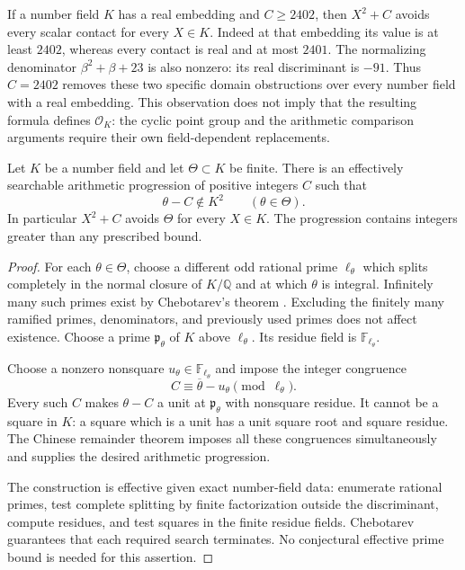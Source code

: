 If a number field $K$ has a real embedding and $C\ge2402$, then
$X^2+C$ avoids every scalar contact for every $X\in K$. Indeed at
that embedding its value is at least $2402$, whereas every contact
is real and at most $2401$. The normalizing denominator
$\beta^2+\beta+23$ is also nonzero: its real discriminant is
$-91$. Thus $C=2402$ removes these two specific domain obstructions
over every number field with a real embedding. This observation
does not imply that the resulting formula defines $\mathcal O_K$:
the cyclic point group and the arithmetic comparison arguments
require their own field-dependent replacements.

\begin{lemma}
\label{p3:finite-square-avoidance}
Let $K$ be a number field and let $\Theta\subset K$ be finite.
There is an effectively searchable arithmetic progression of positive
integers $C$ such that
\[
                  \theta-C\notin K^2
                       \qquad(\theta\in\Theta).
\]
In particular $X^2+C$ avoids $\Theta$ for every $X\in K$. The
progression contains integers greater than any prescribed bound.
\end{lemma}
\begin{proof}
For each $\theta\in\Theta$, choose a different odd rational prime
$\ell_\theta$ which splits completely in the normal closure of
$K/\mathbb Q$ and at which $\theta$ is integral. Infinitely many
such primes exist by Chebotarev's theorem
\cite[Section~2.1, Theorem~1]{p2lbSerre1981}. Excluding the finitely
many ramified primes, denominators, and previously used primes
does not affect existence. Choose a prime $\mathfrak p_\theta$
of $K$ above $\ell_\theta$. Its residue field is
$\mathbb F_{\ell_\theta}$.

Choose a nonzero nonsquare
$u_\theta\in\mathbb F_{\ell_\theta}$ and impose the integer
congruence
\[
                C\equiv\overline\theta-u_\theta
                       \pmod{\ell_\theta}.
\]
Every such $C$ makes $\theta-C$ a unit at
$\mathfrak p_\theta$ with nonsquare residue. It cannot be a
square in $K$: a square which is a unit has a unit square root
and square residue. The Chinese remainder theorem imposes all
these congruences simultaneously and supplies the desired
arithmetic progression.

The construction is effective given exact number-field data:
enumerate rational primes, test complete splitting by finite
factorization outside the discriminant, compute residues, and
test squares in the finite residue fields. Chebotarev guarantees
that each required search terminates. No conjectural effective
prime bound is needed for this assertion.
\end{proof}

